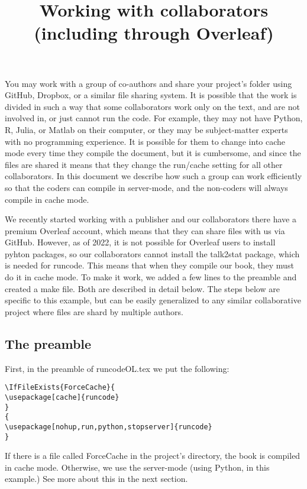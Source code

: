 \documentclass[12pt]{article}
\begin{document}
\title{Working with collaborators (including through Overleaf)}
\maketitle

You may work with a group of co-authors and share your project's folder using GitHub, Dropbox, or a similar file sharing system.
It is possible that the work is divided in such a way that some collaborators work only on the text, and are not involved in, or just cannot run the code. For example, they may not have Python, R, Julia, or Matlab on their computer, or they may be subject-matter experts with no programming experience.
It is possible for them to change into cache mode every time they compile the document, but it is cumbersome, and since the files are shared it means that they change the run/cache setting for all other collaborators. In this document we describe how such a group can work efficiently so that the coders can compile in server-mode, and the non-coders will always compile in cache mode.

We recently started working with a publisher and our collaborators there have a premium Overleaf account, which means that they can share files with us via GitHub. However, as of 2022, it is not possible for Overleaf users to install pyhton packages, so our collaborators cannot install the talk2stat package, which is needed for runcode. This means that when they compile our book, they must do it in cache mode. To make it work, we added a few lines to the preamble and created a make file. Both are described in detail below. The steps below are specific to this example, but can be easily generalized to any similar collaborative project where files are shard by multiple authors. 

\subsection*{The preamble}

First, in the preamble of runcodeOL.tex we put the following:
\begin{tcolorbox}
\begin{Verbatim}
\IfFileExists{ForceCache}{
\usepackage[cache]{runcode} 
}
{
\usepackage[nohup,run,python,stopserver]{runcode}
}
\end{Verbatim}
\end{tcolorbox}

If there is a file called ForceCache in the project's directory, the book is compiled in cache mode. Otherwise, we use the server-mode (using Python, in this example.) See more about this in the next section.
\end{document}
